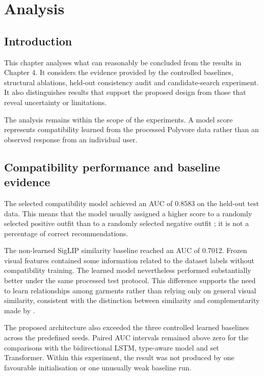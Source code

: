 \chapter{Analysis}

\section{Introduction}

This chapter analyses what can reasonably be concluded from the results in
Chapter 4. It considers the evidence provided by the controlled baselines,
structural ablations, held-out consistency audit and candidate-search experiment. It
also distinguishes results that support the proposed design from those that
reveal uncertainty or limitations.

The analysis remains within the scope of the experiments. A model score
represents compatibility learned from the processed Polyvore data rather than
an observed response from an individual user.

\section{Compatibility performance and baseline evidence}

The selected compatibility model achieved an AUC of 0.8583 on the held-out
test data. This means that the model usually assigned a higher score to a
randomly selected positive outfit than to a randomly selected negative outfit
\parencite{fawcett2006roc}; it is not a percentage of correct recommendations.

The non-learned SigLIP similarity baseline reached an AUC of 0.7012. Frozen
visual features contained some information related to the dataset
labels without compatibility training. The learned model nevertheless
performed substantially better under the same processed test protocol. This
difference supports the need to learn relationships among garments rather than
relying only on general visual similarity, consistent with the distinction
between similarity and complementarity made by \textcite{mcauley2015styles}.

The proposed architecture also exceeded the three controlled learned baselines
across the predefined seeds. Paired AUC intervals remained above zero for the
comparisons with the bidirectional LSTM, type-aware model and set Transformer.
Within this experiment, the result was not produced by one favourable
initialisation or one unusually weak baseline run.

